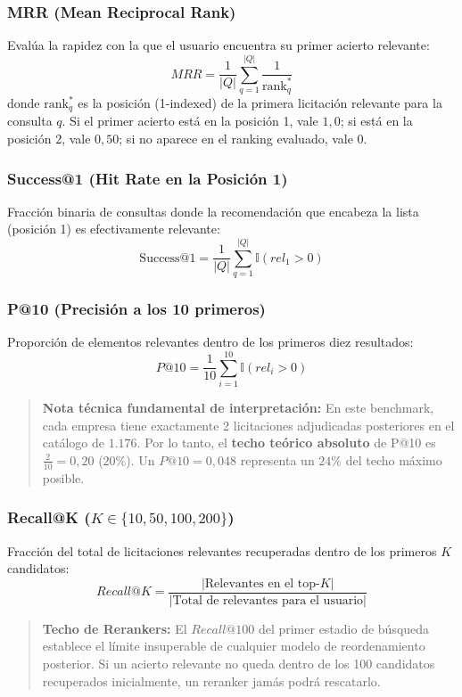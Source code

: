 \documentclass[11pt,a4paper]{article}
\begin{document}
\subsubsection{MRR (Mean Reciprocal Rank)}
Evalúa la rapidez con la que el usuario encuentra su primer acierto relevante:
\begin{equation}
    MRR = \frac{1}{|Q|} \sum_{q=1}^{|Q|} \frac{1}{\text{rank}_{q}^{*}}
\end{equation}
donde $\text{rank}_{q}^{*}$ es la posición (1-indexed) de la primera licitación relevante para la consulta $q$. Si el primer acierto está en la posición 1, vale $1{,}0$; si está en la posición 2, vale $0{,}50$; si no aparece en el ranking evaluado, vale 0.

\subsubsection{Success@1 (Hit Rate en la Posición 1)}
Fracción binaria de consultas donde la recomendación que encabeza la lista (posición 1) es efectivamente relevante:
\begin{equation}
    \text{Success@1} = \frac{1}{|Q|} \sum_{q=1}^{|Q|} \mathbb{I}(rel_1 > 0)
\end{equation}

\subsubsection{P@10 (Precisión a los 10 primeros)}
Proporción de elementos relevantes dentro de los primeros diez resultados:
\begin{equation}
    P@10 = \frac{1}{10} \sum_{i=1}^{10} \mathbb{I}(rel_i > 0)
\end{equation}
\begin{quote}
\textbf{Nota técnica fundamental de interpretación:} En este benchmark, cada empresa tiene exactamente 2 licitaciones adjudicadas posteriores en el catálogo de $1.176$. Por lo tanto, el \textbf{techo teórico absoluto} de P@10 es $\frac{2}{10} = 0{,}20$ ($20\%$). Un $P@10 = 0{,}048$ representa un $24\%$ del techo máximo posible.
\end{quote}

\subsubsection{Recall@K \texorpdfstring{($K \in \{10, 50, 100, 200\}$)}{(K en 10, 50, 100, 200)}}
Fracción del total de licitaciones relevantes recuperadas dentro de los primeros $K$ candidatos:
\begin{equation}
    Recall@K = \frac{|\text{Relevantes en el top-}K|}{|\text{Total de relevantes para el usuario}|}
\end{equation}
\begin{quote}
\textbf{Techo de Rerankers:} El $Recall@100$ del primer estadio de búsqueda establece el límite insuperable de cualquier modelo de reordenamiento posterior. Si un acierto relevante no queda dentro de los 100 candidatos recuperados inicialmente, un reranker jamás podrá rescatarlo.
\end{quote}
\end{document}

